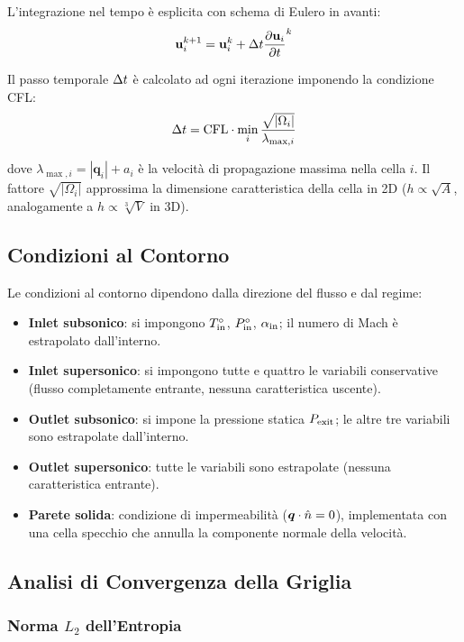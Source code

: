 L'integrazione nel tempo è esplicita con schema di Eulero in avanti:
\begin{equation}
  \mathbf{u}_i^{k+1} = \mathbf{u}_i^k + \Delta t \dfrac{\partial \mathbf{u}_i}{\partial t}^k
\end{equation}

Il passo temporale $\Delta t$ è calcolato ad ogni iterazione imponendo la condizione CFL:
\begin{equation}
  \Delta t = \text{CFL} \cdot \min_i \frac{\sqrt{|\Omega_i|}}{\lambda_{\max,i}}
  \label{eq:cfl}
\end{equation}

dove $\lambda_{\max,i} = |\bm{q}_i| + a_i$ è la velocità di propagazione massima nella
cella $i$. Il fattore $\sqrt{|\Omega_i|}$ approssima la dimensione caratteristica della cella
in 2D ($h \propto \sqrt{A}$, analogamente a $h \propto \sqrt[3]{V}$ in 3D).

\subsection{Condizioni al Contorno}

Le condizioni al contorno dipendono dalla direzione del flusso e dal regime:
\begin{itemize}
  \item \textbf{Inlet subsonico}: si impongono $T^\circ_{\rm in}$, $P^\circ_{\rm in}$,
    $\alpha_{\rm in}$; il numero di Mach è estrapolato dall'interno.
  \item \textbf{Inlet supersonico}: si impongono tutte e quattro le variabili conservative
    (flusso completamente entrante, nessuna caratteristica uscente).
  \item \textbf{Outlet subsonico}: si impone la pressione statica $P_{\rm exit}$;
    le altre tre variabili sono estrapolate dall'interno.
  \item \textbf{Outlet supersonico}: tutte le variabili sono estrapolate (nessuna
    caratteristica entrante).
  \item \textbf{Parete solida}: condizione di impermeabilità ($\bm{q}\cdot\hat{n} = 0$),
    implementata con una cella specchio che annulla la componente normale della velocità.
\end{itemize}

\subsection{Analisi di Convergenza della Griglia}

\subsubsection{Norma $L_2$ dell'Entropia}

